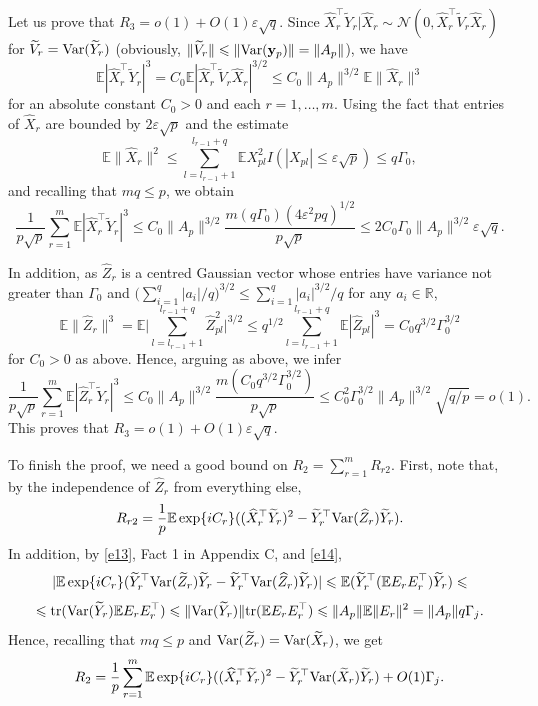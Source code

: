 \documentclass[12pt, a4paper]{article}
\newcommand\bR{{\mathbb R}}
\newcommand\y{{\mathbf y}}
\newcommand\wh{\widehat }
\newcommand\wt{\widetilde }
\newcommand\e{{\mathbb E}}
\newcommand\var{{\rm Var}}
\newcommand\tr{{\mathrm{tr}}}
\begin{document}
Let us prove that $R_3=o(1)+O(1)\varepsilon\sqrt{q}.$ Since $\wh X_r^\top \wt Y_r|\wh X_r\sim\mathcal N(0,\wh X_r^\top \wt V_r\wh X_r) $ for $\wt V_r=\var(\wt Y_r)$ (obviously, $\|\wt V_r\|\leqslant\|\var(\y_p)\|=\|A_p\|$), we   have
\[\e  |\wh X_r^\top \wt Y_r|^3= C_0\e|\wh X_r^\top \wt V_r\wh X_r|^{3/2}\leqslant 
C_0\|A_p\|^{3/2}\e\|\wh X_r\|^{3 }
\]
 for an absolute constant $C_0>0$ and each $r=1,\ldots,m$. Using the fact that entries of $\wh X_r$ are bounded by $2\varepsilon\sqrt{p}$ and the estimate  
\begin{equation}
\label{e19} 
\e\|\wh X_r\|^2\leqslant \sum_{l=l_{r-1}+1}^{l_{r-1}+q}\e X_{pl}^2I(|X_{pl}|\leqslant \varepsilon\sqrt{p}) \leqslant q\Gamma_0,
\end{equation} 
and recalling that $mq\leqslant p$, we obtain 
 \[\frac{1}{p\sqrt{p}}\sum_{r=1}^m\e  |\wh X_r^\top \wt Y_r|^3\leqslant C_0\|A_p\|^{3/2}\frac{m (q\Gamma_0) ( 4\varepsilon^2 pq )^{1/2}}{p\sqrt{p}}\leqslant 2C_0\Gamma_0\|A_p\|^{3/2} \varepsilon\sqrt{q }.\]
 
 In addition, as $\wh Z_r$ is a centred Gaussian vector whose entries have variance not greater than $\Gamma_0$ and $\big(\sum_{i=1}^q|a_i|/q\big)^{3/2}\leqslant \sum_{i=1}^q|a_i|^{3/2}/q $ for any  $a_i\in\bR$,
\[\e\|\wh Z_r\|^{3}=\e\Big|\sum_{l=l_{r-1}+1}^{l_{r-1}+q}\wh Z_{pl}^2\Big|^{3/2}\leqslant   q^{1/2}\sum_{l=l_{r-1}+1}^{l_{r-1}+q}\e|\wh Z_{pl}|^{3 }=C_0q^{3/2}\Gamma_0^{3/2}
\] for $C_0>0 $  as above. Hence, arguing as above, we infer 
\[\frac{1}{p\sqrt{p}}\sum_{r=1}^m\e  |\wh Z_r^\top \wt Y_r|^3\leqslant C_0\|A_p\|^{3/2}\frac{m(C_0q^{3/2}\Gamma_0^{3/2})}{p\sqrt{p}}\leqslant C_0^2\Gamma_0^{3/2}\|A_p\|^{3/2} \sqrt{q/p}=o(1
).\]
This proves that $R_3=o(1)+O(1)\varepsilon\sqrt{q}.$ 

To finish the proof, we need a good bound on $R_2=\sum_{r=1}^mR_{r2}$. First, note that, by the independence of  $\wh Z_r$ from everything else,
\[R_{r2}=\frac{1}{p}\e \exp\{i C_r\}( (\wh X_r^\top \wt Y_r)^2- \wt Y_r^\top \var(\wh Z_r)\wt Y_r). \]
In addition, by \eqref{e13}, Fact 1 in Appendix C, and \eqref{e14}, 
\[|\e \exp\{i C_r\}( \wt Y_r^\top \var(\wt Z_r)\wt Y_r- \wt Y_r^\top \var(\wh Z_r)\wt Y_r)|\leqslant \e ( \wt Y_r^\top (\e E_rE_r^\top ) \wt Y_r)\leqslant\]
\[\leqslant \tr( \var(\wt Y_r) \e E_rE_r^\top)\leqslant \|\var(\wt Y_r)\|\tr(\e E_rE_r^\top)\leqslant  \|A_p\|\e\|E_r\|^2=\|A_p\| q\Gamma_j.\]
Hence,  recalling  that $mq\leqslant p $  and $\var(\wt Z_r)=\var(\wt X_r)$, we get
\[R_2=\frac{1}{p}\sum_{r=1}^m \e \exp\{i C_r\}( (\wh X_r^\top \wt Y_r)^2- \wt Y_r^\top \var(\wt X_r)\wt Y_r)+O(1)\Gamma_j.\]
\end{document}
